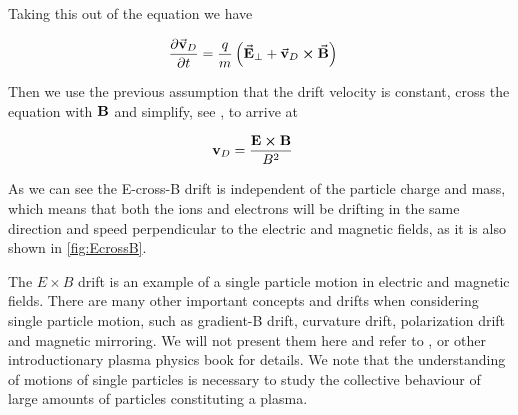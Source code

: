 	Taking this out of the equation we have

	\begin{align}
		\pdv{\va{v}_D}{t} &= \frac{q}{m} \left( \va{E}_\perp + \va{v}_D \cross \va{B} \right)
	\end{align}

	Then we use the previous assumption that the drift velocity is constant,
	cross the equation with \(\vb{B}\) and simplify, see \citet{goldston_introduction_1995},
	to arrive at

	\begin{align}
		\vb{v}_D &= \frac{\vb{E}\cross\vb{B}}{B^2}
	\end{align}

	As we can see the E-cross-B drift is independent of the particle charge and mass,
	which means that both the ions and electrons will be drifting in the same direction and
	speed perpendicular to the electric and magnetic fields, as it is also shown in \cref{fig:EcrossB}.

	The \(E\times B\) drift is an example of a single particle motion in electric and magnetic fields. There are many other important concepts and drifts when
	considering single particle motion, such as gradient-B drift, curvature drift,
	polarization drift and magnetic mirroring. We will not present them here and refer to \citet{fitzpatrick_plasma_2014},
	or other introductionary plasma physics book for details.
	We note that the understanding of motions of single particles is necessary
	to study the collective behaviour of large amounts of particles constituting a plasma.
